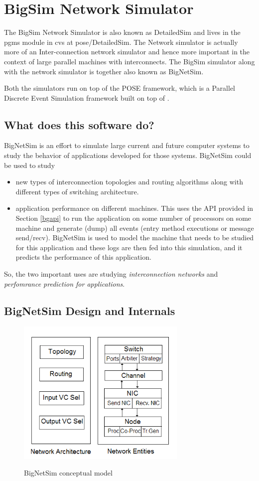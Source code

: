 \section{BigSim Network Simulator}
\label{bignetsim}

The BigSim Network Simulator is also known as DetailedSim and lives 
in the pgms module in cvs at pose/DetailedSim. 
The Network simulator is actually more of an Inter-connection network 
simulator and hence more important in the context of large parallel
machines with interconnects. 
The BigSim simulator  along with the network simulator is together 
also known as BigNetSim.

Both the simulators run on top of the POSE framework, which is a Parallel
Discrete Event Simulation framework built on top of \charmpp{}.


\subsection{What does this software do?}
BigNetSim is an effort to simulate large current and future computer 
systems to study the behavior of applications developed for those systems. 
BigNetSim could be used to study
\begin{itemize}
\item  new types of interconnection topologies and routing algorithms 
along with different types of switching architecture.
\item application performance on different machines. This uses the API
provided in Section \ref{bgapi} to run the application on some number
of processors on some machine and generate (dump) all events (entry
method executions or message send/recv).  BigNetSim is used to 
model the machine that needs to be studied for this application and
these logs are then fed into this simulation, and it predicts the
performance of this application.
\end{itemize}

So, the two important uses are studying {\it interconnection networks} and
{\it perfomrance prediction for applications}.


\subsection{BigNetSim Design and Internals}
\begin{figure}[!t]
\centering  
  \includegraphics[width=3.2in]{figures/detailedsim_newer}
{\sffamily\bfseries\small \caption{BigNetSim conceptual model\label{fig:detailedsim_model}}}
\end{figure}


